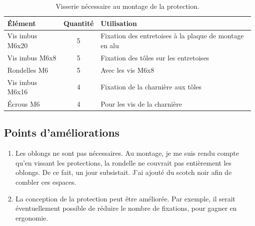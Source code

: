 \begin{minipage}{\textwidth}



    \begin{table}[H]
        \centering
        \renewcommand{\arraystretch}{1.3}
        \begin{tabular}{|l|c|l|}
            \hline
            \textbf{Élément} & \textbf{Quantité} & \textbf{Utilisation}                                   \\
            \hline
            Vis imbus M6x20  & 5                 & Fixation des entretoises à la plaque de montage en alu \\
            Vis imbus M6x8   & 5                 & Fixation des tôles sur les entretoises                 \\
            Rondelles M6     & 5                 & Avec les vis M6x8                                      \\
            Vis imbus M6x16  & 4                 & Fixation de la charnière aux tôles                     \\
            Écrous M6        & 4                 & Pour les vis de la charnière                           \\
            \hline
        \end{tabular}
        \caption{Visserie nécessaire au montage de la protection. \cite{chatgptTableProtectionEntreeLaserVisserie}}
        \label{tab:visserie_protection}
    \end{table}
\end{minipage}
\subsection{Points d'améliorations}
\begin{enumerate}
    \item Les oblongs ne sont pas nécessaires. Au montage, je me suis rendu compte qu'en vissant les protections, la rondelle ne couvrait pas entièrement les oblongs. De ce fait, un jour subsistait. J'ai ajouté du scotch noir afin de combler ces espaces.
    \item La conception de la protection peut être améliorée. Par exemple, il serait éventuellement possible de réduire le nombre de fixations, pour gagner en ergonomie.
\end{enumerate}
\clearpage
